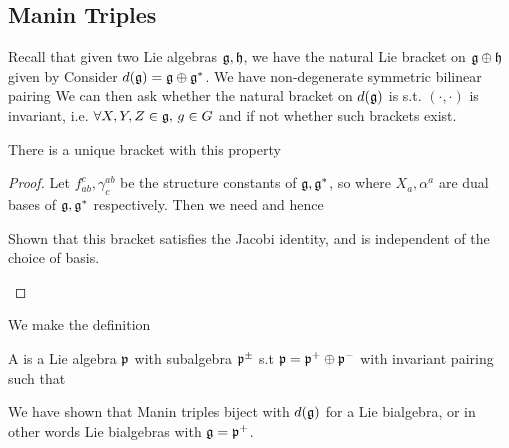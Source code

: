 \documentclass{article}
\begin{document}
\subsection{Manin Triples}
Recall that given two Lie algebras $\mathfrak{g}, \mathfrak{h}$, we have the natural Lie bracket on $\mathfrak{g} \oplus \mathfrak{h}$ given by 
Consider $d(\mathfrak{g}) = \mathfrak{g} \oplus \mathfrak{g}^\ast$. We have non-degenerate symmetric bilinear pairing 
We can then ask whether the natural bracket on $d(\mathfrak{g})$ is s.t. $(\cdot,\cdot)$ is invariant, i.e. $\forall X,Y,Z \in \mathfrak{g}, \, g \in G$
and if not whether such brackets exist. 

\begin{prop}
There is a unique bracket with this property 
\end{prop}
\begin{proof}
Let $f^c_{ab}, \gamma^{ab}_c$ be the structure constants of $\mathfrak{g},\mathfrak{g}^\ast$, so 
 where $X_a,\alpha^a$ are dual bases of $\mathfrak{g},\mathfrak{g}^\ast$ respectively. Then we need
 and hence 
\begin{ex}
Shown that this bracket satisfies the Jacobi identity, and is independent of the choice of basis.
\end{ex}
\end{proof}
We make the definition
\begin{definition}
A  is a Lie algebra $\mathfrak{p}$ with subalgebra $\mathfrak{p}^\pm$ s.t $\mathfrak{p} = \mathfrak{p}^+ \oplus \mathfrak{p}^-$ with invariant pairing such that 
\end{definition}
We have shown that Manin triples biject with $d(\mathfrak{g})$ for a Lie bialgebra, or in other words Lie bialgebras with $\mathfrak{g} = \mathfrak{p}^+$. 
\end{document}
